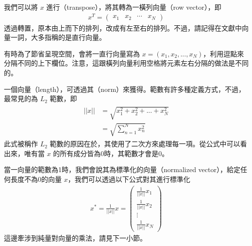 \documentclass[letterpaper,10pt,english]{sphinxmanual}
\begin{document}
我們可以將 \(x\) 進行（transpose），將其轉為一橫列向量（row vector），即
\begin{equation*}
\begin{split}
x^T =
\begin{pmatrix}
x_1 & x_2 & \cdots & x_N
\end{pmatrix}
\end{split}
\end{equation*}
透過轉置，原本由上而下的排列，改成有左至右的排列。不過，請記得在文獻中向量一詞，大多指稱的是直行向量。

有時為了節省呈現空間，會將一直行向量寫為 \(x = (x_1, x_2,...,x_N)\)，利用逗點來分隔不同的上下欄位。注意，這跟橫列向量利用空格將元素左右分隔的做法是不同的。

一個向量（length），可透過其（norm）來獲得。範數有許多種定義方式，不過，最常見的為 \(L_2\) 範數，即
\begin{equation*}
\begin{split}
\begin{aligned}
||x|| &= \sqrt{x_1^2 + x_2^2 +...+x_N^2}\\
& = \sqrt{ \sum_{n=1}^N x_n^2}
\end{aligned}
\end{split}
\end{equation*}
此式被稱作 \(L_2\) 範數的原因在於，其使用了二次方來處理每一項。從公式中可以看出來，唯有當 \(x\) 的所有成分皆為0時，其範數才會是0。

當一向量的範數為1時，我們會說其為標準化的向量（normalized vector），給定任何長度不為0的向量 \(x\)，我們可以透過以下公式對其進行標準化
\begin{equation*}
\begin{split}
x^* = \frac{1}{||x||} x =
\begin{pmatrix}
\frac{1}{||x||} x_1 \\
\frac{1}{||x||} x_2 \\
\vdots \\
\frac{1}{||x||} x_N
\end{pmatrix}
\end{split}
\end{equation*}
這邊牽涉到純量對向量的乘法，請見下一小節。
\end{document}
